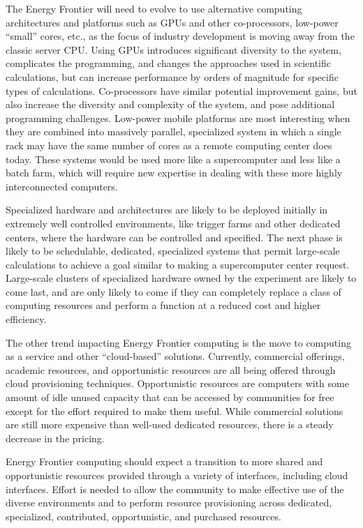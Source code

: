 The Energy Frontier will need to evolve to use alternative computing
architectures and platforms such as GPUs and other co-processors,  low-power
``small'' cores, etc., as the focus of industry development is moving away from
the classic server CPU.  Using GPUs introduces significant diversity to the
system, complicates the programming, and changes the approaches used in
scientific calculations, but can increase performance by orders of magnitude
for specific types of calculations.  Co-processors have similar potential
improvement gains, but also increase the diversity and complexity of the
system, and pose additional programming challenges.  Low-power mobile
platforms are most interesting when they are combined into massively parallel,
specialized system in which a single rack 
may have the same number of cores as a
remote computing center does today.  These systems would be used more like a
supercomputer and less like a batch farm, which will require new
expertise in dealing with these more highly interconnected computers.

Specialized hardware and architectures are likely to be deployed initially in
extremely well controlled environments, like trigger farms and other dedicated
centers, where the hardware can be controlled and specified. The next phase is
likely to be schedulable, dedicated, specialized systems that permit large-scale
calculations to achieve a goal similar to making a supercomputer center
request.  Large-scale clusters of specialized hardware owned by the experiment
are likely to come last, and are only likely to come if they can completely
replace a class of computing resources and perform a function at a reduced
cost and higher efficiency.

The other trend impacting Energy Frontier computing is the move to computing as a service
and other ``cloud-based'' solutions.  Currently,  commercial offerings, academic
resources, and opportunistic resources are all being offered through cloud
provisioning techniques.  Opportunistic resources are computers with some amount
of idle unused capacity that can be accessed by communities for free
except for the effort required to make them useful.
While commercial solutions are still more expensive
than well-used dedicated resources, there is a steady decrease in the pricing.

Energy Frontier computing should expect a transition to more shared and opportunistic
resources provided through a variety of interfaces, including cloud
interfaces.   Effort is needed to allow the community to make effective use of
the diverse environments and to perform resource provisioning across
dedicated, specialized, contributed, opportunistic, and purchased resources.

